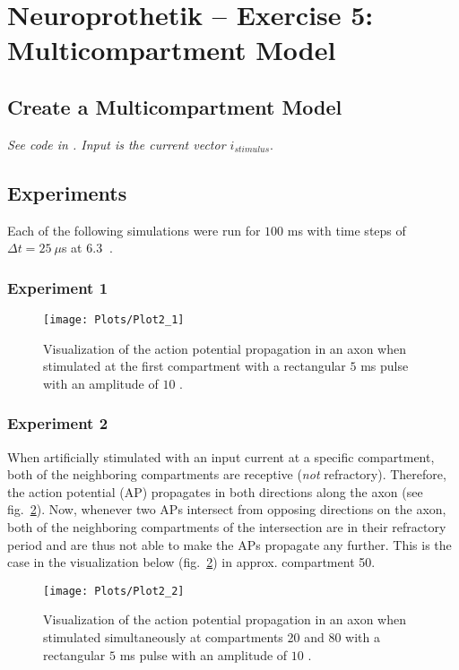 \documentclass[
a4paper, 
12pt, 
]{article}
\begin{document}
	
	\thispagestyle{firstpage} 			%
	
	\section*{Neuroprothetik -- Exercise 5: Multicompartment Model}
	\subsection{Create a Multicompartment Model}
	\emph{See code in . Input is the current vector $i_{stimulus}$}.
	
	\subsection{Experiments}
	Each of the following simulations were run for $100$ ms with time steps of $\Delta t = 25~\mu$s at $6.3~$ \textcelsius. 
	\subsubsection{Experiment 1}
	\begin{figure}[h]
\centering
\texttt{[image: Plots/Plot2\_1]}
\caption{Visualization of the action potential propagation in an axon when stimulated at the first compartment with a rectangular $5$ ms pulse with an amplitude of $10$ .}
\label{fig:Plot2_1}
\end{figure}
	\subsubsection{Experiment 2}
	When artificially stimulated with an input current at a specific compartment, both of the neighboring compartments are receptive (\emph{not} refractory). Therefore, the action potential (AP) propagates in both directions along the axon (see fig.~\ref{fig:Plot2_2}). Now, whenever two APs intersect from opposing directions on the axon, both of the neighboring compartments of the intersection are in their refractory period and are thus not able to make the APs propagate any further. This is the case in the visualization below (fig.~\ref{fig:Plot2_2}) in approx. compartment 50. 
	\begin{figure}[h]
		\centering
		\texttt{[image: Plots/Plot2\_2]}
		\caption{Visualization of the action potential propagation in an axon when stimulated simultaneously at compartments 20 and 80 with a rectangular $5$ ms pulse with an amplitude of $10$ .}
		\label{fig:Plot2_2}
	\end{figure}
	
\end{document}
